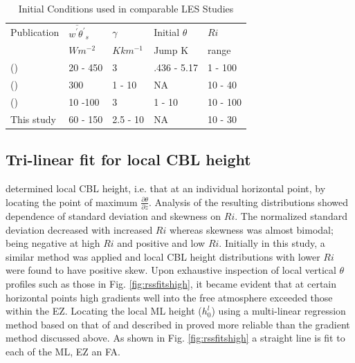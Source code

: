 \documentclass[referee]{svjour3}
\begin{document}
\begin{table}[htbp]
\caption[Initial Conditions used in comparable LES Studies]{Initial Conditions used in comparable LES Studies}

  
    \begin{tabular}{ p{4cm} p{1.4cm} p{1.4cm} p{1.7cm} p{1.8cm}}
    
Publication & $\overline{w^{'}\theta^{'}}_{s}$& $\gamma$& Initial $\theta$ & $Ri$ \\ 
& $Wm^{-2}$ & $Kkm^{-1}$ & Jump K & range \\ \hline
      \citeauthor{Sullivan98} (\citeyear{Sullivan98}) & 20 - 450& 3  &.436 - 5.17 & 1 - 100\\
      \citeauthor{Fedorovich04} (\citeyear{Fedorovich04}) & 300 & 1 - 10 & NA & 10 - 40\\ 
      \citeauthor{Brooks12} (\citeyear{Brooks12}) &  10 -100 &  3& 1 - 10 &10 - 100 \\
      This study & 60 - 150 & 2.5 - 10& NA & 10 - 30\\ \hline 
      
    \end{tabular}
\label{table:initconditcomp}   

\end{table}

\subsection{Tri-linear fit for local CBL height}
\cite{Sullivan98} determined local CBL height, i.e. that at an individual horizontal point, by locating the point of maximum $\frac{\partial \theta}{\partial z}$.  Analysis of the resulting distributions showed dependence of standard deviation and skewness on $Ri$.  The normalized standard deviation decreased with increased $Ri$ whereas skewness was almost bimodal; being negative at high $Ri$ and positive and low $Ri$.  Initially in this study, a similar method was applied and local CBL height distributions with lower $Ri$ were found to have positive skew.  Upon exhaustive inspection of local vertical $\theta$  profiles such as those in Fig. \ref{fig:rssfitshigh}, it became evident that at certain horizontal points high gradients well into the free atmosphere exceeded those within the EZ.  Locating the local ML height ($h^{l}_{0}$) using a multi-linear regression method based on that of \citep{Vieth} and described in \cite{Nchap14} proved more reliable than the gradient method discussed above.  As shown in Fig. \ref{fig:rssfitshigh} a straight line is fit to each of the ML, EZ an FA.\\
  
\end{document}
